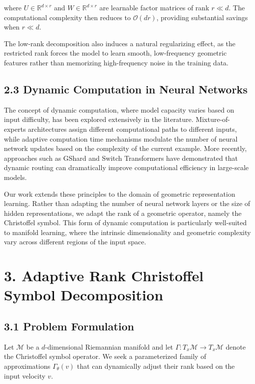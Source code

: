 \documentclass[12pt]{article}
\begin{document}
where $U \in \mathbb{R}^{d \times r}$ and $W \in \mathbb{R}^{d \times r}$ are learnable factor matrices of rank $r \ll d$. The computational complexity then reduces to $\mathcal{O}(dr)$, providing substantial savings when $r \ll d$.

The low-rank decomposition also induces a natural regularizing effect, as the restricted rank forces the model to learn smooth, low-frequency geometric features rather than memorizing high-frequency noise in the training data.

\subsection{2.3 Dynamic Computation in Neural Networks}

The concept of dynamic computation, where model capacity varies based on input difficulty, has been explored extensively in the literature. Mixture-of-experts architectures assign different computational paths to different inputs, while adaptive computation time mechanisms modulate the number of neural network updates based on the complexity of the current example. More recently, approaches such as GShard and Switch Transformers have demonstrated that dynamic routing can dramatically improve computational efficiency in large-scale models.

Our work extends these principles to the domain of geometric representation learning. Rather than adapting the number of neural network layers or the size of hidden representations, we adapt the rank of a geometric operator, namely the Christoffel symbol. This form of dynamic computation is particularly well-suited to manifold learning, where the intrinsic dimensionality and geometric complexity vary across different regions of the input space.

\section{3. Adaptive Rank Christoffel Symbol Decomposition}

\subsection{3.1 Problem Formulation}

Let $\mathcal{M}$ be a $d$-dimensional Riemannian manifold and let $\Gamma: T_x\mathcal{M} \to T_x\mathcal{M}$ denote the Christoffel symbol operator. We seek a parameterized family of approximations $\Gamma_\theta(v)$ that can dynamically adjust their rank based on the input velocity $v$.
\end{document}
